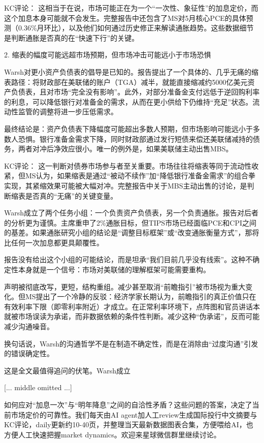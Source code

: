\documentclass[11pt]{ctexart}
\begin{document}
KC评论： 这相当于在说，市场可能正在为一个“一次性、象征性”的加息定价，而这个加息本身可能就不会发生。完整报告中还包含了MS对5月核心PCE的具体预测（0.36\%月环比），以及他们如何通过历史修正来解读通胀趋势。这些数据细节是判断通胀是否真的在“快速下行”的关键。

2. 缩表的幅度可能远超市场预期，但市场冲击可能远小于市场恐惧

Warsh对更小资产负债表的倡导是已知的。报告提出了一个具体的、几乎无痛的缩表路径：将财政部在美联储的账户（TGA）减半，就能直接缩减约5000亿美元资产负债表，且对市场“完全没有影响”。此外，对部分准备金支付远低于逆回购利率的利息，可以降低银行对准备金的需求，从而在更小供给下仍维持“充足”状态。流动性监管的调整将进一步压低需求。

最终结论是：资产负债表下降幅度可能超出多数人预期，但市场影响可能远小于多数人恐惧。银行准备金需求下降，同时财政部通过发行短债来偿还美联储减持的债务，两者对冲后净效应很小。唯一的例外是，如果美联储主动出售MBS。

KC评论： 这一判断对债券市场参与者至关重要。市场往往将缩表等同于流动性收紧，但MS认为，如果缩表是通过“被动不续作”加“降低银行准备金需求”的组合拳实现，其紧缩效果可能被大幅对冲。完整报告中关于MBS主动出售的讨论，是判断缩表是否真的“无痛”的关键变量。

Warsh成立了两个任务小组：一个负责资产负债表，另一个负责通胀。报告对后者的分析更为谨慎。主席重申了2\%通胀目标，但TIPS市场已经面临PCE和CPI之间的基差。如果通胀研究小组的结论是“调整目标框架”或“改变通胀衡量方式”，那将比任何一次加息都更具颠覆性。

报告没有给出这个小组的可能结论，而是坦承“我们目前几乎没有线索”。这种不确定性本身就是一个信号：市场对美联储的理解框架可能需要重构。

声明被彻底改写，更短，结构重组。减少甚至取消“前瞻指引”被市场视为重大变化。但MS提出了一个冷静的反驳：经济学家长期认为，前瞻指引的真正价值只在有效利率下限（即零利率附近）才成立。在正常利率环境下，点阵图和官员讲话本就被市场误读为承诺，而非数据依赖的条件性判断。减少这种“伪承诺”，反而可能减少沟通噪音。

换句话说，Warsh的沟通哲学不是在制造不确定性，而是在消除由“过度沟通”引发的错误确定性。

这是全文最值得追问的伏笔。Warsh成立

[... middle omitted ...]

如何应对“加息一次”与“明年降息”之间的自洽性矛盾？这些问题的答案，决定了当前市场定价的可靠性。我们每天由AI agent加人工review生成国际投行中文摘要与KC评论，daily更新约10-40页，并整理当天最新数据图表合集，方便喂给AI，也方便人工快速把握market dynamics。欢迎来星球微信群里继续讨论。
\end{document}
